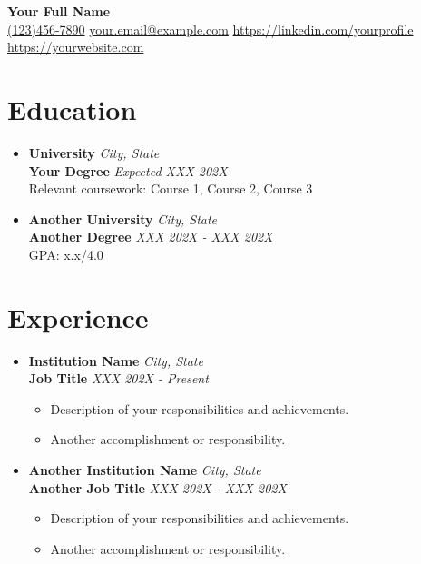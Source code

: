 \documentclass[10pt]{article}
\newcommand{\sectionline}{\noindent\makebox[\linewidth]{\rule{\textwidth}{0.5pt}}}
\newcommand{\resumesection}[1]{\vspace{-0.5em}\section*{\textbf{#1}}\vspace{-1.5em}\sectionline\vspace{0.0em}}
\newenvironment{resumeitemize}
{\begin{itemize}[leftmargin=*, noitemsep, topsep=0pt, label={}]} %
{\end{itemize}}
\newenvironment{subitemize}
{\begin{itemize}[leftmargin=*, noitemsep, topsep=0pt, label=\textbullet]} %
{\end{itemize}}
\begin{document}
\begin{center}
    {\Huge \textbf{Your Full Name}} \\[0.5em]
    \href{tel:1234567890}{(123)456-7890} \textbar{} 
    \href{mailto:your.email@example.com}{your.email@example.com} \textbar{}
    \href{https://linkedin.com/yourprofile}{https://linkedin.com/yourprofile} \textbar{} \href{https://yourwebsite.com}{https://yourwebsite.com}
\end{center}

\vspace{-0.25in}

\resumesection{Education}
\begin{resumeitemize}
    \item \textbf{University} \hfill \textit{City, State} \\
    \textbf{Your Degree} \hfill \textit{Expected XXX 202X} \\
    Relevant coursework: Course 1, Course 2, Course 3

    \vspace{0.1in}
    
    \item \textbf{Another University} \hfill \textit{City, State} \\
    \textbf{Another Degree} \hfill \textit{XXX 202X - XXX 202X} \\
    GPA: x.x/4.0
\end{resumeitemize}

\resumesection{Experience}
\begin{resumeitemize}
    \item \textbf{Institution Name} \hfill \textit{City, State} \\
    \textbf{Job Title} \hfill \textit{XXX 202X - Present}
    \begin{subitemize}
        \item Description of your responsibilities and achievements.
        \item Another accomplishment or responsibility.
    \end{subitemize}
    
    \vspace{0.1in}
    
    \item \textbf{Another Institution Name} \hfill \textit{City, State} \\
    \textbf{Another Job Title} \hfill \textit{XXX 202X - XXX 202X} 
    \begin{subitemize}
        \item Description of your responsibilities and achievements.
        \item Another accomplishment or responsibility.
    \end{subitemize}
\end{resumeitemize}
\end{document}
